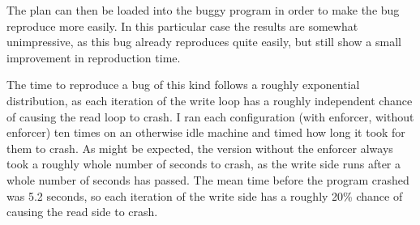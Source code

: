 
The plan can then be loaded into the buggy program in order to make
the bug reproduce more easily.  In this particular case the results
are somewhat unimpressive, as this bug already reproduces quite
easily, but still show a small improvement in reproduction time.

The time to reproduce a bug of this kind follows a roughly exponential
distribution, as each iteration of the write loop has a roughly
independent chance of causing the read loop to crash.  I ran each
configuration (with enforcer, without enforcer) ten times on an
otherwise idle machine and timed how long it took for them to crash.
As might be expected, the version without the enforcer always took a
roughly whole number of seconds to crash, as the write side runs after
a whole number of seconds has passed.  The mean time before the
program crashed was 5.2 seconds, so each iteration of the write side
has a roughly 20\% chance of causing the read side to
crash.

